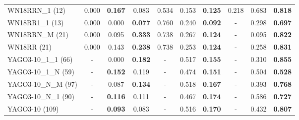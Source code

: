 \begin{table}[t]
{\begin{tabular}{l||ccc|ccc|ccc}
WN18RRN\_1 (12) & 0.000 & \textbf{0.167} & 0.083 & 0.534 & 0.153 & \textbf{0.125} & 0.218 & 0.683 & \textbf{0.818} \\
WN18RR1\_1 (13) & 0.000 & 0.000 & \textbf{0.077} & 0.760 & 0.240 & \textbf{0.092} & - & 0.298 & \textbf{0.697} \\
WN18RRN\_M (21) & 0.000 & 0.095 & \textbf{0.333} & 0.738 & 0.267 & \textbf{0.124} & - & 0.095 & \textbf{0.822} \\
WN18RR (21) & 0.000 & 0.143 & \textbf{0.238} & 0.738 & 0.253 & \textbf{0.124} & - & 0.258 & \textbf{0.831} \\
YAGO3-10\_1\_1 (66) & - & 0.000 & \textbf{0.182} & - & 0.517 & \textbf{0.155} & - & 0.310 & \textbf{0.855} \\
YAGO3-10\_1\_N (59) & - & \textbf{0.152} & 0.119 & - & 0.474 & \textbf{0.151} & - & 0.504 & \textbf{0.528} \\
YAGO3-10\_N\_M (97) & - & 0.087 & \textbf{0.134} & - & 0.518 & \textbf{0.167} & - & 0.393 & \textbf{0.768} \\
YAGO3-10\_N\_1 (90) & - & \textbf{0.116} & 0.111 & - & 0.467 & \textbf{0.174} & - & 0.586 & \textbf{0.727} \\
YAGO3-10 (109) & - & \textbf{0.093} & 0.083 & - & 0.516 & \textbf{0.170} & - & 0.432 & \textbf{0.807} \\
\hline
\end{tabular}%
}
\end{table}
